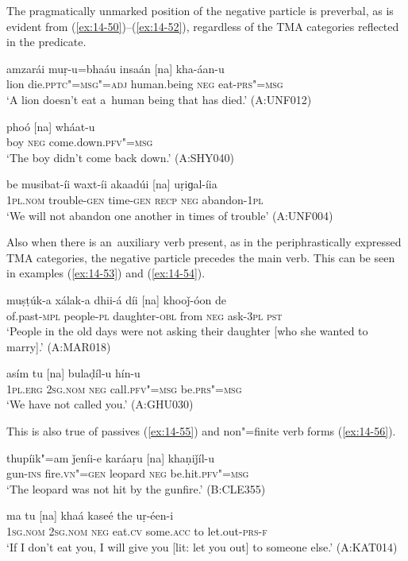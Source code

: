 The pragmatically unmarked position of the negative particle is preverbal, as is evident from (\ref{ex:14-50})--(\ref{ex:14-52}), regardless of the TMA categories reflected in the predicate.

\begin{exe}
\ex
\label{ex:14-50}
\gll amzarái muṛ-u=bhaáu insaán [na] kha-áan-u \\
lion die.\textsc{pptc"=msg"=adj} human.being \textsc{neg} eat-\textsc{prs"=msg} \\
\glt `A lion doesn't eat a~human being that has died.' (A:UNF012)

\ex
\label{ex:14-51}
\gll phoó [na] wháat-u \\
boy \textsc{neg} come.down.\textsc{pfv"=msg } \\
\glt `The boy didn't come back down.' (A:SHY040)

\ex
\label{ex:14-52}
\gll be musibat-íi waxt-íi akaadúi [na] uṛiɡal-íia\\
\textsc{1pl.nom} trouble-\textsc{gen} time-\textsc{gen} \textsc{recp} \textsc{neg} abandon-\textsc{1pl}\\
\glt `We will not abandon one another in times of trouble' (A:UNF004)
\end{exe}

Also when there is an~auxiliary verb present, as in the periphrastically expressed TMA categories, the negative particle precedes the main verb. This can be seen in examples (\ref{ex:14-53}) and (\ref{ex:14-54}).

\begin{exe}
\ex
\label{ex:14-53}
\gll muṣṭúk-a xálak-a dhii-á díi [na] khooǰ-óon de \\
of.past-\textsc{mpl} people-\textsc{pl} daughter-\textsc{obl} from \textsc{neg} ask-\textsc{3pl} \textsc{pst}  \\
\glt `People in the old days were not asking their daughter [who she wanted to marry].' (A:MAR018)

\ex
\label{ex:14-54}
\gll asím tu [na] bulaḍíl-u hín-u \\
\textsc{1pl.erg} \textsc{2sg.nom} \textsc{neg} call.\textsc{pfv"=msg} be.\textsc{prs"=msg} \\
\glt `We have not called you.' (A:GHU030)
\end{exe}

This is also true of passives (\ref{ex:14-55}) and non"=finite verb forms (\ref{ex:14-56}).

\begin{exe}
\ex
\label{ex:14-55}
\gll thupíik"=am ǰeníi-e karáaṛu [na] khaṇiǰíl-u \\
gun-\textsc{ins} fire.\textsc{vn"=gen} leopard \textsc{neg} be.hit.\textsc{pfv"=msg}  \\
\glt `The leopard was not hit by the gunfire.' (B:CLE355)

\ex
\label{ex:14-56}
\gll ma tu [na] khaá kaseé the uṛ-éen-i \\
\textsc{1sg.nom} \textsc{2sg.nom} \textsc{neg} eat.\textsc{cv} some.\textsc{acc} to let.out-\textsc{prs-f} \\
\glt `If I don't eat you, I will give you [lit: let you out] to someone else.' (A:KAT014)
\end{exe}

